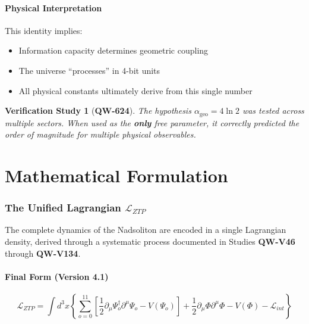 \documentclass[11pt, a4paper]{article}
\newtheorem{verification}{Verification Study}[section]
\theoremstyle{remark}
\newcommand{\Lagr}{\mathcal{L}}
\newcommand{\alphageo}{\alpha_{\text{geo}}}
\newcommand{\QW}[1]{\textbf{QW-#1}}
\begin{document}
\subsection{Physical Interpretation}

This identity implies:
\begin{itemize}
    \item Information capacity determines geometric coupling
    \item The universe ``processes'' in 4-bit units
    \item All physical constants ultimately derive from this single number
\end{itemize}

\begin{verification}[\QW{624}]
The hypothesis $\alphageo = 4 \ln 2$ was tested across multiple sectors. When used as the \textbf{only} free parameter, it correctly predicted the order of magnitude for multiple physical observables.
\end{verification}

\newpage
\part{Mathematical Formulation}

\section{The Unified Lagrangian $\Lagr_{ZTP}$}

The complete dynamics of the Nadsoliton are encoded in a single Lagrangian density, derived through a systematic process documented in Studies \QW{V46} through \QW{V134}.

\subsection{Final Form (Version 4.1)}

\begin{equation}
\boxed{
\Lagr_{ZTP} = \int d^3x \left\{
    \sum_{o=0}^{11} \left[ \frac{1}{2} \partial_\mu\Psi_o^\dagger \partial^\mu\Psi_o - V(\Psi_o) \right]
    + \frac{1}{2} \partial_\mu\Phi \partial^\mu\Phi - V(\Phi)
    - \Lagr_{int}
\right\}
}
\label{eq:lagrangian}
\end{equation}
\end{document}
